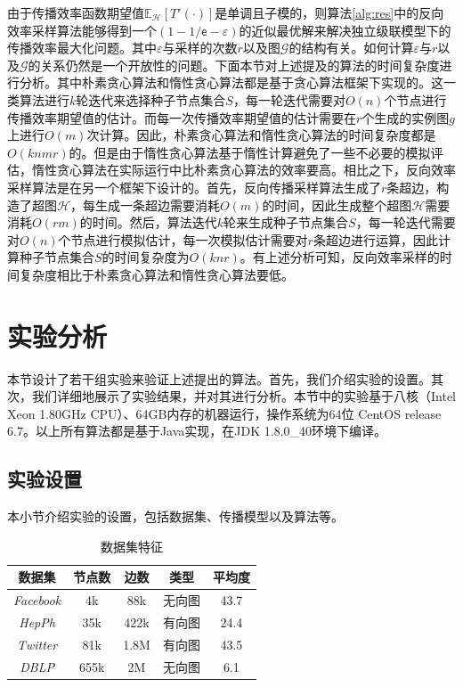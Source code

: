 由于传播效率函数期望值$\mathbb{E}_\mathcal{H}\left[T'\left(\cdot\right)\right]$是单调且子模的，则算法\ref{alg:res}中的反向效率采样算法能够得到一个$\left(1-1/\mathsf{e}-\varepsilon\right)$的近似最优解来解决独立级联模型下的传播效率最大化问题。其中$\varepsilon$与采样的次数$r$以及图$\mathcal{G}$的结构有关。如何计算$\varepsilon$与$r$以及$\mathcal{G}$的关系仍然是一个开放性的问题。下面本节对上述提及的算法的时间复杂度进行分析。其中朴素贪心算法和惰性贪心算法都是基于贪心算法框架下实现的。这一类算法进行$k$轮迭代来选择种子节点集合$S$，每一轮迭代需要对$O\left(n\right)$个节点进行传播效率期望值的估计。而每一次传播效率期望值的估计需要在$r$个生成的实例图$g$上进行$O\left(m\right)$次计算。因此，朴素贪心算法和惰性贪心算法的时间复杂度都是$O\left(knmr\right)$的。但是由于惰性贪心算法基于惰性计算避免了一些不必要的模拟评估，惰性贪心算法在实际运行中比朴素贪心算法的效率要高。相比之下，反向效率采样算法是在另一个框架下设计的。首先，反向传播采样算法生成了$r$条超边，构造了超图$\mathcal{H}$，每生成一条超边需要消耗$O\left(m\right)$的时间，因此生成整个超图$\mathcal{H}$需要消耗$O\left(rm\right)$的时间。然后，算法迭代$k$轮来生成种子节点集合$S$，每一轮迭代需要对$O\left(n\right)$个节点进行模拟估计，每一次模拟估计需要对$r$条超边进行运算，因此计算种子节点集合$S$的时间复杂度为$O\left(knr\right)$。有上述分析可知，反向效率采样的时间复杂度相比于朴素贪心算法和惰性贪心算法要低。

\section{实验分析}
\label{3sec:experiment}
本节设计了若干组实验来验证上述提出的算法。首先，我们介绍实验的设置。其次，我们详细地展示了实验结果，并对其进行分析。本节中的实验基于八核（Intel Xeon 1.80GHz CPU）、64GB内存的机器运行，操作系统为64位 CentOS release 6.7。以上所有算法都是基于Java实现，在JDK 1.8.0\_40环境下编译。
\subsection{实验设置}
\label{3subsec:settings}
本小节介绍实验的设置，包括数据集、传播模型以及算法等。
\begin{table}[!ht]
\centering
\caption{数据集特征}
\label{tab:dataset}
\begin{tabular}{ |c|c|c|c|c| }
\hline
\textbf{数据集} & \textbf{节点数} & \textbf{边数} & \textbf{类型} & \textbf{平均度} \\
\hline
\textit{Facebook} & 4k & 88k & 无向图 & 43.7\\
\hline
\textit{HepPh} & 35k & 422k & 有向图 & 24.4\\
\hline
\textit{Twitter} & 81k & 1.8M & 有向图 & 43.5\\
\hline
\textit{DBLP} & 655k & 2M & 无向图 & 6.1\\
\hline
\end{tabular}
\end{table}

